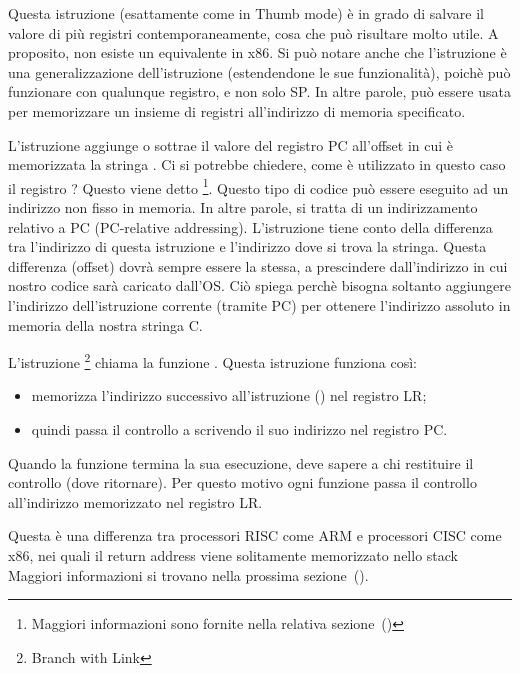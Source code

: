 Questa istruzione (esattamente come \PUSH in Thumb mode) è in grado di salvare il valore di più registri contemporaneamente, cosa che può risultare molto utile.
A proposito, non esiste un equivalente in x86.
Si può notare anche che l'istruzione  è una generalizzazione dell'istruzione \PUSH (estendendone le sue funzionalità), poichè può funzionare con qualunque registro, e non solo \ac{SP}.
In altre parole,  può essere usata per memorizzare un insieme di registri all'indirizzo di memoria specificato.

\myindex{\PICcode}
L'istruzione 
aggiunge o sottrae il valore del registro \ac{PC} all'offset in cui è memorizzata la stringa .
Ci si potrebbe chiedere, come è utilizzato in questo caso il registro ?
Questo viene detto \q{\PICcode}
\footnote{Maggiori informazioni sono fornite nella relativa sezione~()}.
Questo tipo di codice può essere eseguito ad un indirizzo non fisso in memoria.
In altre parole, si tratta di un indirizzamento relativo a \ac{PC} (\ac{PC}-relative addressing).
L'istruzione  tiene conto della differenza tra l'indirizzo di questa istruzione e l'indirizzo dove si trova la stringa.
Questa differenza (offset) dovrà sempre essere la stessa, a prescindere dall'indirizzo in cui nostro codice sarà caricato dall'\ac{OS}.
Ciò spiega perchè bisogna soltanto aggiungere l'indirizzo dell'istruzione corrente (tramite \ac{PC}) per ottenere l'indirizzo assoluto in memoria della nostra stringa C.

L'istruzione \footnote{Branch with Link} chiama la funzione \printf.
Questa istruzione funziona così:
\begin{itemize}
\item memorizza l'indirizzo successivo all'istruzione  () nel registro \ac{LR};
\item quindi passa il controllo a \printf scrivendo il suo indirizzo nel registro \ac{PC}.
\end{itemize}

Quando la funzione \printf termina la sua esecuzione, deve sapere a chi restituire il controllo (dove ritornare). Per questo motivo ogni funzione passa il controllo all'indirizzo memorizzato nel registro \ac{LR}.

Questa è una differenza tra processori \ac{RISC}  come ARM e processori \ac{CISC} come x86, nei quali il return address viene solitamente memorizzato nello stack
Maggiori informazioni si trovano nella prossima sezione~().


